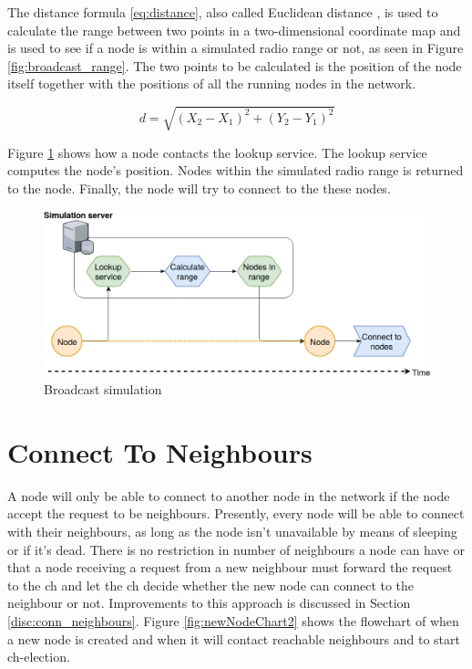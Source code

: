 \documentclass[USenglish]{uit-thesis}
\begin{document}
The distance formula \ref{eq:distance}, also called Euclidean distance \cite{euclidean}, is used to calculate the range between two points in a two-dimensional coordinate map and is used to see if a node is within a simulated radio range or not, as seen in Figure \ref{fig:broadcast_range}. The two points to be calculated is the position of the node itself together with the positions of all the running nodes in the network.

\begin{equation} \label{eq:distance}
d = \sqrt{(X_{2} - X_{1})^{2}+(Y_{2} - Y_{1})^{2}}
\end{equation}

\newpage

Figure \ref{fig:broadcast_simulation} shows how a node contacts the lookup service. The lookup service computes the node's position. Nodes within the simulated radio range is returned to the node. Finally, the node will try to connect to the these nodes.

\begin{figure} %
\centering
\includegraphics[width=\textwidth]{broadcast_simulation_kopi.png}
\caption{Broadcast simulation}
\label{fig:broadcast_simulation}
\end{figure}

\section{Connect To Neighbours}
A node will only be able to connect to another node in the network if the node accept the request to be neighbours. Presently, every node will be able to connect with their neighbours, as long as the node isn't unavailable by means of sleeping or if it's dead. There is no restriction in number of neighbours a node can have or that a node receiving a request from a new neighbour must forward the request to the \gls{ch} and let the \gls{ch} decide whether the new node can connect to the neighbour or not. Improvements to this approach is discussed in Section \ref{disc:conn_neighbours}. Figure \ref{fig:newNodeChart2} shows the flowchart of when a new node is created and when it will contact reachable neighbours and to start \gls{ch}-election.
\end{document}
